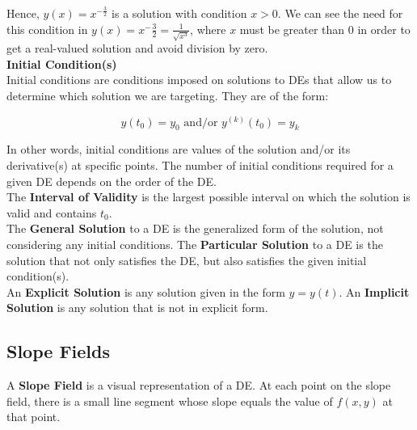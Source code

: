         \noindent Hence, $y(x)=x^{-\frac{3}{2}}$ is a solution with condition $x>0$. We can see
        the need for this condition in $y(x)=x^-\frac{3}{2}=\frac{1}{\sqrt{x^3}}$, where $x$ must
        be greater than 0 in order to get a real-valued solution and avoid division by zero. \\

        \noindent \color{purple} \textbf{Initial Condition(s)} \color{black} \\
        \noindent Initial conditions are conditions imposed on solutions to DEs that allow us
        to determine which solution we are targeting. They are of the form:

        \begin{equation*}
            y(t_0) = y_0 \text{ and/or } y^{(k)}(t_0)=y_k
        \end{equation*}

        \noindent In other words, initial conditions are values of the solution and/or its
        derivative(s) at specific points. The number of initial conditions required for a given
        DE depends on the order of the DE. \\

        \noindent The \color{purple} \textbf{Interval of Validity} \color{black} is the largest
        possible interval on which the solution is valid and contains $t_0$. \\

        \noindent The \color{purple} \textbf{General Solution} \color{black} to a DE is the
        generalized form of the solution, not considering any initial conditions. The
        \color{purple} \textbf{Particular Solution} \color{black} to a DE is the
        solution that not only satisfies the DE, but also satisfies the given initial condition(s). \\

        \noindent An \color{purple} \textbf{Explicit Solution} \color{black} is any solution
        given in the form $y=y(t)$. An \color{purple} \textbf{Implicit Solution} \color{black}
        is any solution that is not in explicit form.



    \subsection{Slope Fields}
        A \color{purple} \textbf{Slope Field} \color{black} is a visual representation of a DE.
        At each point on the slope field, there is a small line segment whose slope equals the
        value of $f(x,y)$ at that point. \\

